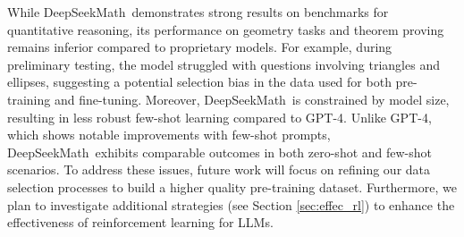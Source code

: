 While DeepSeekMath~demonstrates strong results on benchmarks for quantitative reasoning, its performance on geometry tasks and theorem proving remains inferior compared to proprietary models. For example, during preliminary testing, the model struggled with questions involving triangles and ellipses, suggesting a potential selection bias in the data used for both pre-training and fine-tuning. Moreover, DeepSeekMath~is constrained by model size, resulting in less robust few-shot learning compared to GPT-4. Unlike GPT-4, which shows notable improvements with few-shot prompts, DeepSeekMath~exhibits comparable outcomes in both zero-shot and few-shot scenarios. To address these issues, future work will focus on refining our data selection processes to build a higher quality pre-training dataset. Furthermore, we plan to investigate additional strategies (see Section \ref{sec:effec_rl}) to enhance the effectiveness of reinforcement learning for LLMs.

